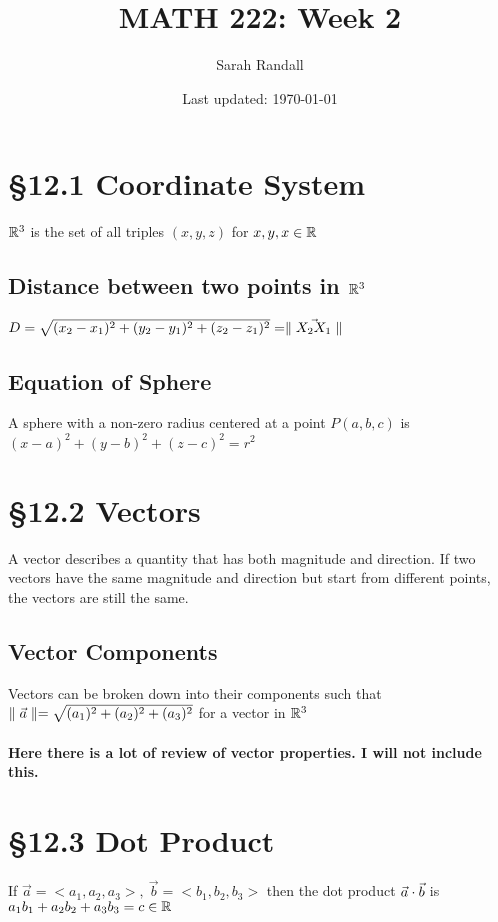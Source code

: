 \documentclass[12 pt]{article}
\author{Sarah Randall}
\date{Last updated: \today}
\title{MATH 222: Week 2}
\begin{document}
	\onehalfspacing
	\maketitle
	\tableofcontents
    \section{\S 12.1 Coordinate System}
        $\mathbb{R}^3$ is the set of all triples $(x,y,z)$ for $x,y,x\in\mathbb{R}$
        \subsection{Distance between two points in $\mathbb{R}^3$}

        $D=\sqrt{(x_2-x_1)^2+(y_2-y_1)^2+(z_2-z_1)^2}=\parallel \vec{X_2X_1} \parallel$
        \subsection{Equation of Sphere}

        A sphere with a non-zero radius centered at a point $P(a,b,c)$ is\\
        $(x-a)^2+(y-b)^2+(z-c)^2=r^2$
	\section{\S 12.2 Vectors}
		A vector describes a quantity that has both magnitude and direction. If two vectors have the same magnitude and direction but start from different points, the vectors are still the same.

		\subsection{Vector Components}

		Vectors can be broken down into their components such that $\parallel \vec{a} \parallel=\sqrt{(a_1)^2+(a_2)^2+(a_3)^2}$ for a vector in $\mathbb{R}^3$\\\\
		\textbf{Here there is a lot of review of vector properties. I will not include this.}
	\section{\S 12.3 Dot Product}
		\begin{def*}If $\vec{a}=<a_1,a_2,a_3>,\ \vec{b}=<b_1,b_2,b_3>$ then the dot product $\vec{a}\cdot\vec{b}$ is $a_1b_1+a_2b_2+a_3b_3=c\in\mathbb{R}$
		\end{def*}
\end{document}
